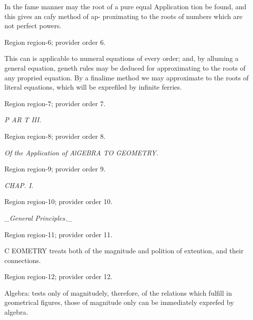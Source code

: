 \documentclass[11pt]{article}
\begin{document}
In the fame manner may the root of a pure equal Application
tion be found, and this gives an cafy method of ap-
proximating to the roots of numbers which are not
perfect powers.
\par

{\scriptsize\color{gray} Region region-6; provider order 6.\par}
\medskip

This can is applicable to numeral equations of every
order; and, by alluming a general equation, geneth
rules may be deduced for approximating to the roots
of any propried equation. By a finalime method we
may approximate to the roots of literal equations,
which will be exprefiled by infinite ferries.
\par

{\scriptsize\color{gray} Region region-7; provider order 7.\par}
\medskip

{\small\itshape P AR T III.\par}

{\scriptsize\color{gray} Region region-8; provider order 8.\par}
\medskip

{\small\itshape Of the Application of AlGEBRA TO GEOMETRY.\par}

{\scriptsize\color{gray} Region region-9; provider order 9.\par}
\medskip

{\small\itshape CHAP. I.\par}

{\scriptsize\color{gray} Region region-10; provider order 10.\par}
\medskip

{\small\itshape \_General Principles.\_\par}

{\scriptsize\color{gray} Region region-11; provider order 11.\par}
\medskip

C EOMETRY treats both of the magnitude and
polition of extention, and their connections.
\par

{\scriptsize\color{gray} Region region-12; provider order 12.\par}
\medskip

Algebra: tests only of magnitudely, therefore, of
the relations which fulfill in geometrical figures, those
of magnitude only can be immediately exprefed by
algebra.
\par
\end{document}

